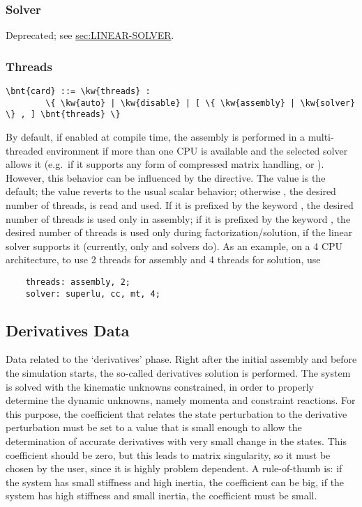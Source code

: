 \subsubsection{Solver}   
Deprecated; see
\hyperref{\kw{linear solver}}{\kw{linear solver} (Section~}{)}{sec:LINEAR-SOLVER}.


\subsubsection{Threads}   
\begin{Verbatim}[commandchars=\\\{\}]
    \bnt{card} ::= \kw{threads} :
        \{ \kw{auto} | \kw{disable} | [ \{ \kw{assembly} | \kw{solver} \} , ] \bnt{threads} \}
\end{Verbatim}
By default, if enabled at compile time, the assembly is performed
in a multi-threaded environment if more than one CPU is available 
and the selected solver allows it (e.g.\ if it supports any form 
of compressed matrix handling,  or ).
However, this behavior can be influenced by the  directive.
The value  is the default; the value  reverts
to the usual scalar behavior; otherwise , the desired 
number of threads, is read and used.
If it is prefixed by the keyword , the desired number
of threads is used only in assembly; if it is prefixed by the keyword
, the desired number of threads is used only during 
factorization/solution, if the linear solver supports it (currently,
only  and  solvers do).
As an example, on a 4 CPU architecture, to use 2 threads for assembly
and 4 threads for solution, use
\begin{verbatim}
    threads: assembly, 2;
    solver: superlu, cc, mt, 4;
\end{verbatim}





\subsection{Derivatives Data}
Data related to the `derivatives' phase.
Right after the initial assembly and before the simulation starts, the
so-called derivatives solution is performed. The system is solved with
the kinematic unknowns constrained, in order to properly determine the
dynamic unknowns, namely momenta and constraint reactions. For this
purpose, the coefficient that relates the state perturbation to the
derivative perturbation must be set to a value that is small enough to
allow the determination of accurate derivatives with very small change
in the states. This coefficient should be zero, but this leads to matrix
singularity, so it must be chosen by the user, since it is highly
problem dependent. A rule-of-thumb is: if the system has small
stiffness and high inertia, the coefficient can be big, if the system
has high stiffness and small inertia, the coefficient must be small.

